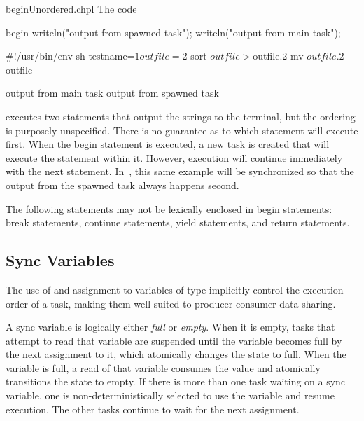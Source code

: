 \begin{chapelexample}{beginUnordered.chpl}
The code
\begin{chapel}
begin writeln("output from spawned task");
writeln("output from main task");
\end{chapel}
\begin{chapelprediff}
\#!/usr/bin/env sh
testname=$1
outfile=$2
sort $outfile > $outfile.2
mv $outfile.2 $outfile
\end{chapelprediff}
\begin{chapeloutput}
output from main task
output from spawned task
\end{chapeloutput}
executes two  statements that output the strings to the
terminal, but the ordering is purposely unspecified.  There is no
guarantee as to which statement will execute first.  When the
begin statement is executed, a new task is created that will execute
the  statement within it.  However, execution will
continue immediately with the next statement.
In~, this same example will be synchronized so
that the output from the spawned task always happens second.
\end{chapelexample}

The following statements may not be lexically enclosed in
begin statements: break statements, continue statements,
yield statements, and return statements.

\subsection{Sync Variables}
\label{Sync_Variables}

The use of and assignment to variables of  type implicitly
control the execution order of a task, making them well-suited to
producer-consumer data sharing.

A sync variable is logically either {\em full} or {\em empty}.  When
it is empty, tasks that attempt to read that variable are suspended
until the variable becomes full by the next assignment to it, which
atomically changes the state to full.  When the variable is full, a
read of that variable consumes the value and atomically transitions
the state to empty.  If there is more than one task waiting on a sync
variable, one is non-deterministically selected to use the variable
and resume execution.  The other tasks continue to wait for the next
assignment.

